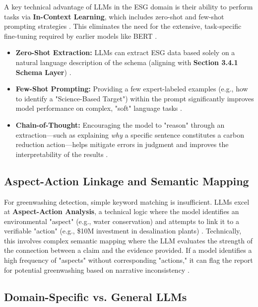 A key technical advantage of LLMs in the ESG domain is their ability to perform tasks via \textbf{In-Context Learning}, which includes zero-shot and few-shot prompting strategies  \parencite{frederik_maibaum_b8629037}. This eliminates the need for the extensive, task-specific fine-tuning required by earlier models like BERT  \parencite[]{tae_sun_chung_e16a4c18, frederik_maibaum_b8629037}.
\begin{itemize}
\item 

\textbf{Zero-Shot Extraction:} LLMs can extract ESG data based solely on a natural language description of the schema (aligning with \textbf{Section 3.4.1 Schema Layer})  \parencite{marco_bronzini_bf94d949}.\item 

\textbf{Few-Shot Prompting:} Providing a few expert-labeled examples (e.g., how to identify a "Science-Based Target") within the prompt significantly improves model performance on complex, "soft" language tasks  \parencite[]{frederik_maibaum_b8629037, arash_hajikhani_cbb2528f}.\item 

\textbf{Chain-of-Thought:} Encouraging the model to "reason" through an extraction—such as explaining \textit{why} a specific sentence constitutes a carbon reduction action—helps mitigate errors in judgment and improves the interpretability of the results  \parencite{arash_hajikhani_cbb2528f}.
\end{itemize}
\subsection{Aspect-Action Linkage and Semantic Mapping}

For greenwashing detection, simple keyword matching is insufficient. LLMs excel at \textbf{Aspect-Action Analysis}, a technical logic where the model identifies an environmental "aspect" (e.g., water conservation) and attempts to link it to a verifiable "action" (e.g., \$10M investment in desalination plants)  \parencite{keane_ong_369a0b63}. Technically, this involves complex semantic mapping where the LLM evaluates the strength of the connection between a claim and the evidence provided. If a model identifies a high frequency of "aspects" without corresponding "actions," it can flag the report for potential greenwashing based on narrative inconsistency  \parencite[]{xiaojia_wang_02351a60, keane_ong_369a0b63}.
\subsection{ Domain-Specific vs. General LLMs}


